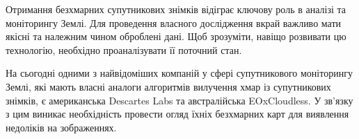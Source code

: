 Отримання безхмарних супутникових знімків %
відіграє ключову роль в аналізі та моніторингу
Землі.  Для проведення власного дослідження %
вкрай важливо мати якісні та належним чином
оброблені дані.  Щоб зрозуміти, навіщо %
розвивати цю технологію, необхідно %
проаналізувати
її поточний стан.

На сьогодні одними з найвідоміших компаній у %
сфері супутникового моніторингу Землі, які
мають власні аналоги алгоритмів вилучення хмар %
із супутникових знімків, є американська
Descartes Labs та австралійська EOxCloudless.  У зв'язку з %
цим виникає необхідність
провести огляд їхніх безхмарних карт для %
виявлення недоліків на зображеннях.
